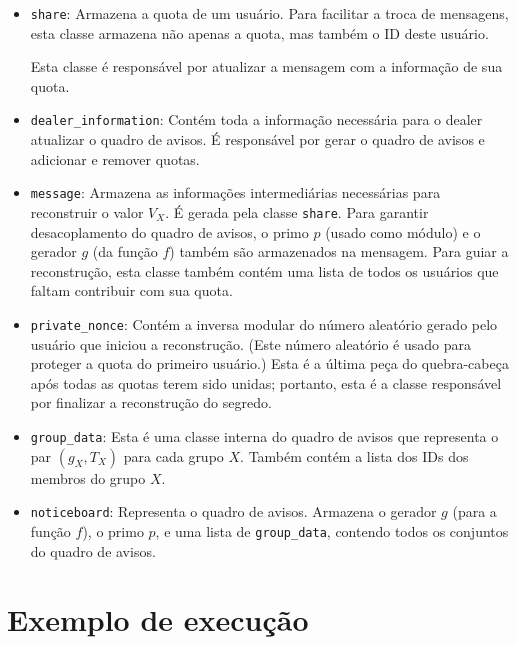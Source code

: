 \documentclass[10pt,twocolumn]{article}
\begin{document}
\begin{itemize}
    \item \verb"share":
        Armazena a quota de um usuário.
        Para facilitar a troca de mensagens,
        esta classe armazena não apenas a quota,
        mas também o ID deste usuário.

        Esta classe é responsável por atualizar a mensagem
        com a informação de sua quota.

    \item \verb"dealer_information":
        Contém toda a informação necessária para o dealer atualizar o quadro de avisos.
        É responsável por gerar o quadro de avisos
        e adicionar e remover quotas.

    \item \verb"message":
        Armazena as informações intermediárias necessárias
        para reconstruir o valor $V_X$.
        É gerada pela classe \verb"share".
        Para garantir desacoplamento do quadro de avisos,
        o primo $p$ (usado como módulo)
        e o gerador $g$ (da função $f$)
        também são armazenados na mensagem.
        Para guiar a reconstrução,
        esta classe também contém uma lista de todos os usuários
        que faltam contribuir com sua quota.

    \item \verb"private_nonce":
        Contém a inversa modular
        do número aleatório gerado pelo usuário que iniciou a reconstrução.
        (Este número aleatório é usado para proteger a quota
        do primeiro usuário.)
        Esta é a última peça do quebra-cabeça após todas as quotas terem sido unidas;
        portanto, esta é a classe responsável por finalizar a reconstrução do segredo.
        
    \item \verb"group_data":
        Esta é uma classe interna do quadro de avisos
        que representa o par $(g_X, T_X)$ para cada grupo $X$.
        Também contém a lista dos IDs dos membros do grupo $X$.

    \item \verb"noticeboard":
        Representa o quadro de avisos.
        Armazena o gerador $g$ (para a função $f$),
        o primo $p$,
        e uma lista de \verb"group_data",
        contendo todos os conjuntos do quadro de avisos.
\end{itemize}

\section{Exemplo de execução}
\end{document}
